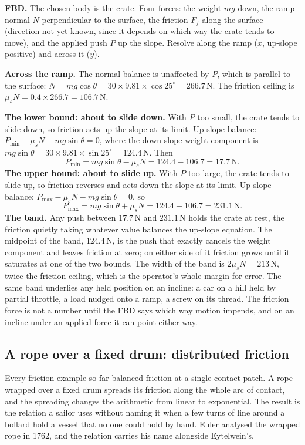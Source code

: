 \textbf{FBD.} The chosen body is the crate. Four forces: the weight $mg$
down, the ramp normal $N$ perpendicular to the surface, the friction $F_f$
along the surface (direction not yet known, since it depends on which way the
crate tends to move), and the applied push $P$ up the slope. Resolve along
the ramp ($x$, up-slope positive) and across it ($y$).

\textbf{Across the ramp.} The normal balance is unaffected by $P$, which is
parallel to the surface: $N = mg\cos\theta = 30 \times 9.81 \times \cos
25^{\circ} = 266.7\,\text{N}$. The friction ceiling is $\mu_s N = 0.4 \times
266.7 = 106.7\,\text{N}$.

\textbf{The lower bound: about to slide down.} With $P$ too small, the crate
tends to slide down, so friction acts up the slope at its limit. Up-slope
balance: $P_{\min} + \mu_s N - mg\sin\theta = 0$, where the down-slope weight
component is $mg\sin\theta = 30 \times 9.81 \times \sin 25^{\circ} =
124.4\,\text{N}$. Then
\[
P_{\min} = mg\sin\theta - \mu_s N = 124.4 - 106.7 = 17.7\,\text{N}.
\]
\textbf{The upper bound: about to slide up.} With $P$ too large, the crate
tends to slide up, so friction reverses and acts down the slope at its limit.
Up-slope balance: $P_{\max} - \mu_s N - mg\sin\theta = 0$, so
\[
P_{\max} = mg\sin\theta + \mu_s N = 124.4 + 106.7 = 231.1\,\text{N}.
\]
\textbf{The band.} Any push between $17.7\,\text{N}$ and $231.1\,\text{N}$
holds the crate at rest, the friction quietly taking whatever value balances
the up-slope equation. The midpoint of the band, $124.4\,\text{N}$, is the
push that exactly cancels the weight component and leaves friction at zero;
on either side of it friction grows until it saturates at one of the two
bounds. The width of the band is $2\mu_s N = 213\,\text{N}$, twice the
friction ceiling, which is the operator's whole margin for error. The same
band underlies any held position on an incline: a car on a hill held by
partial throttle, a load nudged onto a ramp, a screw on its thread. The
friction force is not a number until the FBD says which way motion impends,
and on an incline under an applied force it can point either way.

\subsection{A rope over a fixed drum: distributed friction}



Every friction example so far balanced friction at a single contact patch.
A rope wrapped over a fixed drum spreads its friction along the whole arc of
contact, and the spreading changes the arithmetic from linear to
exponential. The result is the relation a sailor uses without naming it when
a few turns of line around a bollard hold a vessel that no one could hold by
hand. Euler analysed the wrapped rope in 1762, and the relation carries his
name alongside Eytelwein's.

